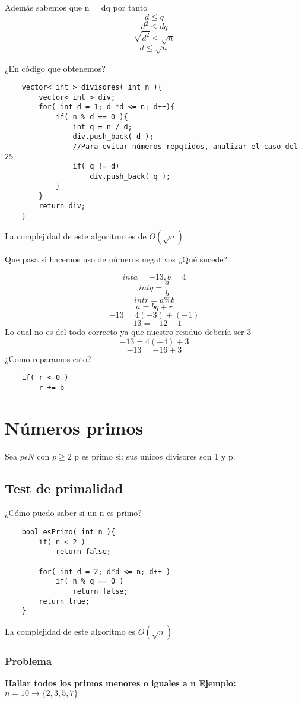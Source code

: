 Además sabemos que n = dq por tanto \newline
\[ d \leq q \]
\[ d^{2} \leq dq \]
\[ \sqrt{d^{2}} \leq \sqrt{n} \]
\[ d \leq \sqrt{n} \]

¿En código que obtenemos?

\begin{lstlisting}
    vector< int > divisores( int n ){
        vector< int > div;
        for( int d = 1; d *d <= n; d++){
            if( n % d == 0 ){
                int q = n / d;
                div.push_back( d );
                //Para evitar números repqtidos, analizar el caso del 25
                if( q != d)
                    div.push_back( q );
            }
        }
        return div;
    }
\end{lstlisting}

La complejidad de este algoritmo es de $O(\sqrt{n})$ \newline

Que pasa si hacemos uso de números negativos ¿Qué sucede?

\[ int a = -13, b = 4\]
\[ int q = \frac{a}{b} \]
\[ int r = a \% b \]
\[ a = bq + r\]
\[ -13 = 4(-3) + (-1)\]
\[ -13 = -12 - 1\]
Lo cual no es del todo correcto ya que nuestro residuo debería ser 3
\[ -13 = 4(-4) + 3\]
\[ -13 = -16 + 3\]
¿Como reparamos esto?
\begin{lstlisting}
    if( r < 0 )
        r += b
\end{lstlisting}

\section{Números primos}

Sea $p \epsilon N$ con $p \geq 2$ p es primo si: sus unicos divisores son 1 y p.

\subsection{Test de primalidad}
¿Cómo puedo saber si un n es primo?
\begin{lstlisting}
    bool esPrimo( int n ){
        if( n < 2 )
            return false;

        for( int d = 2; d*d <= n; d++ )
            if( n % q == 0 )
                return false;
        return true;
    }
\end{lstlisting}
La complejidad de este algoritmo es $O(\sqrt{n})$

\subsubsection{Problema}
\textbf{Hallar todos los primos menores o iguales a n \newline Ejemplo: }
$ n = 10 \rightarrow \{ 2, 3, 5, 7 \}$ \newline

